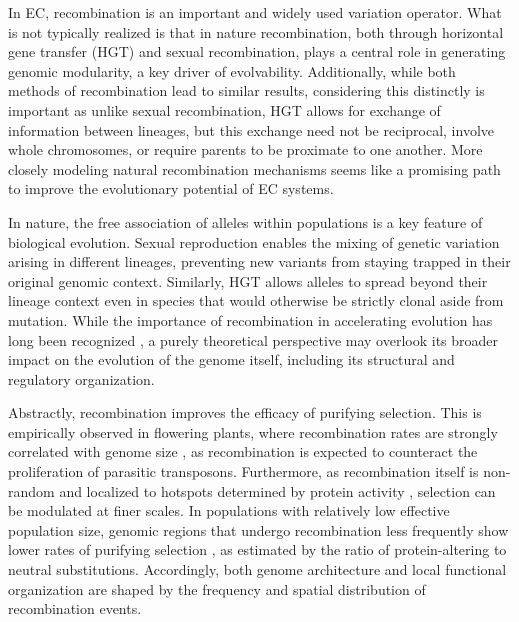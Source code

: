 In EC, recombination is an important and widely used variation operator.
What is not typically realized is that in nature recombination, both through horizontal gene transfer (HGT) and sexual recombination, plays a central role in generating genomic modularity, a key driver of evolvability.
Additionally, while both methods of recombination lead to similar results, considering this distinctly is important as unlike sexual recombination, HGT allows for exchange of information between lineages, but this exchange need not be reciprocal, involve whole chromosomes, or require parents to be proximate to one another.
More closely modeling natural recombination mechanisms seems like a promising path to improve the evolutionary potential of EC systems.

In nature, the free association of alleles within populations is a key feature of biological evolution.
Sexual reproduction enables the mixing of genetic variation arising in different lineages, preventing new variants from staying trapped in their original genomic context.
Similarly, HGT allows alleles to spread beyond their lineage context even in species that would otherwise be strictly clonal aside from mutation.
While the importance of recombination in accelerating evolution has long been recognized \citep{felsenstein1976evolutionary}, a purely theoretical perspective may overlook its broader impact on the evolution of the genome itself, including its structural and regulatory organization.

Abstractly, recombination improves the efficacy of purifying selection.
This is empirically observed in flowering plants, where recombination rates are strongly correlated with genome size \citep{tiley2015relationship}, as recombination is expected to counteract the proliferation of parasitic transposons.
Furthermore, as recombination itself is non-random and localized to hotspots determined by protein activity \citep{paul2016recombination}, selection can be modulated at finer scales.
In populations with relatively low effective population size, genomic regions that undergo recombination less frequently show lower rates of purifying selection \citep{leroy2021island}, as estimated by the ratio of protein-altering to neutral substitutions.
Accordingly, both genome architecture and local functional organization are shaped by the frequency and spatial distribution of recombination events.

